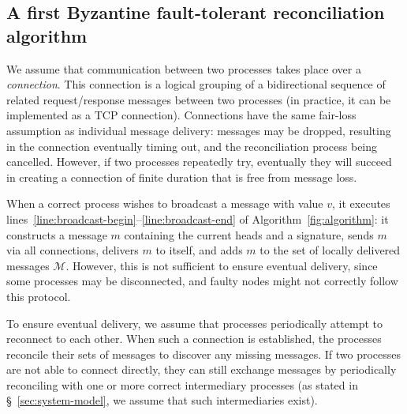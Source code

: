 \documentclass[a4paper,anonymous,USenglish]{lipics-v2019}
\begin{document}
\subsection{A first Byzantine fault-tolerant reconciliation algorithm}\label{sec:algorithm1}

We assume that communication between two processes takes place over a \emph{connection}.
This connection is a logical grouping of a bidirectional sequence of related request/response messages between two processes (in practice, it can be implemented as a TCP connection).
Connections have the same fair-loss assumption as individual message delivery: messages may be dropped, resulting in the connection eventually timing out, and the reconciliation process being cancelled.
However, if two processes repeatedly try, eventually they will succeed in creating a connection of finite duration that is free from message loss.

When a correct process wishes to broadcast a message with value $v$, it executes lines~\ref{line:broadcast-begin}--\ref{line:broadcast-end} of Algorithm~\ref{fig:algorithm}: it constructs a message $m$ containing the current heads and a signature, sends $m$ via all connections, delivers $m$ to itself, and adds $m$ to the set of locally delivered messages $\mathcal{M}$.
However, this is not sufficient to ensure eventual delivery, since some processes may be disconnected, and faulty nodes might not correctly follow this protocol.

To ensure eventual delivery, we assume that processes periodically attempt to reconnect to each other.
When such a connection is established, the processes reconcile their sets of messages to discover any missing messages.
If two processes are not able to connect directly, they can still exchange messages by periodically reconciling with one or more correct intermediary processes (as stated in \S~\ref{sec:system-model}, we assume that such intermediaries exist).
\end{document}
